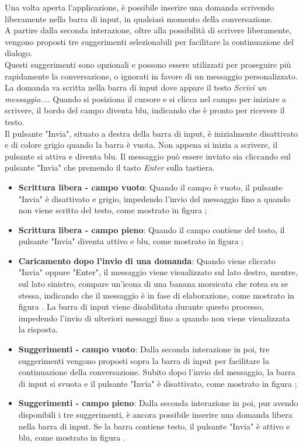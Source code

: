 Una volta aperta l'applicazione, è possibile inserire una domanda scrivendo liberamente nella barra di input, in qualsiasi momento della conversazione.\\
A partire dalla seconda interazione, oltre alla possibilità di scrivere liberamente, vengono proposti tre suggerimenti selezionabili per facilitare la continuazione del dialogo.\\
Questi suggerimenti sono opzionali e possono essere utilizzati per proseguire più rapidamente la conversazione, o ignorati in favore di un messaggio personalizzato.\\
La domanda va scritta nella barra di input dove appare il testo \textit{Scrivi un messaggio...}. Quando si posiziona il cursore e si clicca nel campo per iniziare a scrivere, il bordo del campo diventa blu, indicando che è pronto per ricevere il testo.\\
Il pulsante "Invia", situato a destra della barra di input, è inizialmente disattivato e di colore grigio quando la barra è vuota. Non appena si inizia a scrivere, il pulsante si attiva e diventa blu.
Il messaggio può essere inviato sia cliccando sul pulsante "Invia" che premendo il tasto \textit{Enter} sulla tastiera.  

\begin{itemize}  
    \item \textbf{Scrittura libera - campo vuoto}: Quando il campo è vuoto, il pulsante "Invia" è disattivato e grigio, impedendo l'invio del messaggio fino a quando non viene scritto del testo, come mostrato in figura ;
    \item \textbf{Scrittura libera - campo pieno}: Quando il campo contiene del testo, il pulsante "Invia" diventa attivo e blu, come mostrato in figura ;
    \item \textbf{Caricamento dopo l'invio di una domanda}: Quando viene cliccato "Invia" oppure "Enter", il messaggio viene visualizzato sul lato destro, mentre, sul lato sinistro, compare un'icona di una banana morsicata che rotea su se stessa, indicando che il messaggio è in fase di elaborazione, come mostrato in figura . La barra di input viene disabilitata durante questo processo, impedendo l'invio di ulteriori messaggi fino a quando non viene visualizzata la risposta.
    \item \textbf{Suggerimenti - campo vuoto}: Dalla seconda interazione in poi, tre suggerimenti vengono proposti sopra la barra di input per facilitare la continuazione della conversazione. Subito dopo l'invio del messaggio, la barra di input si svuota e il pulsante "Invia" è disattivato, come mostrato in figura ;
    \item \textbf{Suggerimenti - campo pieno}: Dalla seconda interazione in poi, pur avendo disponibili i tre suggerimenti, è ancora possibile inserire una domanda libera nella barra di input. Se la barra contiene testo, il pulsante "Invia" è attivo e blu, come mostrato in figura .
\end{itemize}

